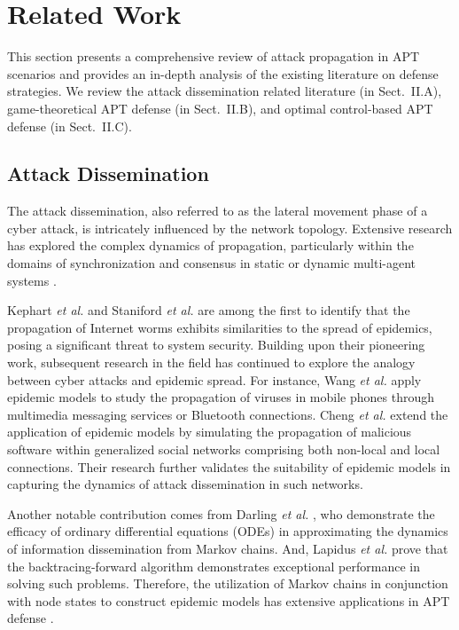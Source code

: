 \documentclass[lettersize,journal]{IEEEtran}
\begin{document}
\section{Related Work}
This section presents a comprehensive review of attack propagation in APT scenarios and provides an in-depth analysis of the existing literature on defense strategies. We review the attack dissemination related literature (in Sect.~II.A), game-theoretical APT defense (in Sect.~II.B), and optimal control-based APT defense (in Sect.~II.C).

\par


\subsection{Attack Dissemination}
The attack dissemination, also referred to as the lateral movement phase \cite{AttackMatrix} of a cyber attack, is intricately influenced by the network topology. Extensive research has explored the complex dynamics of propagation, particularly within the domains of synchronization and consensus in static or dynamic multi-agent systems \cite{lu2005time}.
\par
Kephart \emph{et al.} \cite{kephart1992directed} and Staniford \emph{et al.} \cite{staniford2002own} are among the first to identify that the propagation of Internet worms exhibits similarities to the spread of epidemics, posing a significant threat to system security. Building upon their pioneering work, subsequent research in the field has continued to explore the analogy between cyber attacks and epidemic spread. For instance, Wang \emph{et al.} \cite{wang2009understanding} apply epidemic models to study the propagation of viruses in mobile phones through multimedia messaging services or Bluetooth connections. Cheng \emph{et al.} \cite{cheng2010modeling} extend the application of epidemic models by simulating the propagation of malicious software within generalized social networks comprising both non-local and local connections. Their research further validates the suitability of epidemic models in capturing the dynamics of attack dissemination in such networks. 
\par
Another notable contribution comes from Darling \emph{et al.} \cite{darling2008differential}, who demonstrate the efficacy of ordinary differential equations (ODEs) in approximating the dynamics of information dissemination from Markov chains. And, Lapidus \emph{et al.} \cite{lapidus1971numerical} prove that the backtracing-forward algorithm demonstrates exceptional performance in solving such problems. Therefore, the utilization of Markov chains in conjunction with node states to construct epidemic models \cite{zino2021analysis} has extensive applications in APT defense \cite{yangEffectiveRepairStrategy2019,yangEffectiveQuarantineRecovery2021}.
\end{document}
